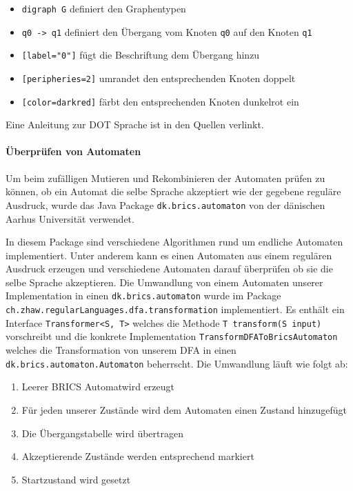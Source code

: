 \begin{itemize}
  \item \lstinline$digraph G$ definiert den Graphentypen
  \item \lstinline$q0 -> q1$ definiert den Übergang vom Knoten \lstinline$q0$ auf den Knoten \lstinline$q1$
  \item \lstinline$[label="0"]$ fügt die Beschriftung \frqq dem Übergang hinzu
  \item \lstinline$[peripheries=2]$ umrandet den entsprechenden Knoten doppelt
  \item \lstinline$[color=darkred]$ färbt den entsprechenden Knoten dunkelrot ein
\end{itemize}

Eine Anleitung zur DOT Sprache ist in den Quellen verlinkt. \cite{graphvizdotref}

\paragraph{Überprüfen von Automaten}
Um beim zufälligen Mutieren und Rekombinieren der Automaten prüfen zu können, ob ein Automat die selbe Sprache akzeptiert wie der gegebene reguläre Ausdruck, wurde das Java Package \lstinline$dk.brics.automaton$ von der dänischen Aarhus Universität verwendet.\cite{bricsautomaton}

In diesem Package sind verschiedene Algorithmen rund um endliche Automaten implementiert. Unter anderem kann es einen Automaten aus einem regulären Ausdruck erzeugen und verschiedene Automaten darauf überprüfen ob sie die selbe Sprache akzeptieren. Die Umwandlung von einem Automaten unserer Implementation in einen \lstinline$dk.brics.automaton$ wurde im Package \lstinline$ch.zhaw.regularLanguages.dfa.transformation$ implementiert. Es enthält ein Interface \lstinline$Transformer<S, T>$ welches die Methode \lstinline$T transform(S input)$ vorschreibt und die konkrete Implementation \lstinline$TransformDFAToBricsAutomaton$ welches die Transformation von unserem DFA in einen \lstinline$dk.brics.automaton.Automaton$ beherrscht. Die Umwandlung läuft wie folgt ab:
\begin{enumerate}
  \item Leerer \flqq BRICS Automat\frqq wird erzeugt
  \item Für jeden unserer Zustände wird dem Automaten einen Zustand hinzugefügt
  \item Die Übergangstabelle wird übertragen
  \item Akzeptierende Zustände werden entsprechend markiert
  \item Startzustand wird gesetzt
\end{enumerate}

